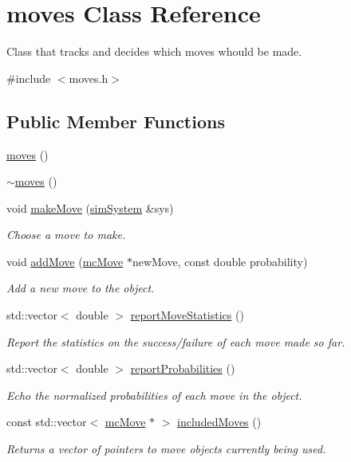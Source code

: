 \hypertarget{classmoves}{}\section{moves Class Reference}
\label{classmoves}


Class that tracks and decides which moves whould be made.  




{\ttfamily \#include $<$moves.\+h$>$}

\subsection*{Public Member Functions}
\begin{DoxyCompactItemize}
\item 
\hyperlink{classmoves_ac0af4672a995044ebba99f4a5865b28b}{moves} ()
\item 
\hyperlink{classmoves_a00dfff19abe056adceb0ccf41778ee0f}{$\sim$moves} ()
\item 
void \hyperlink{classmoves_a7f023913b80bb62604b99f4dbf005c37}{make\+Move} (\hyperlink{classsim_system}{sim\+System} \&sys)
\begin{DoxyCompactList}\small\item\em Choose a move to make. \end{DoxyCompactList}\item 
void \hyperlink{classmoves_a8ff3fea6241c0708ed08651c0b8c0c32}{add\+Move} (\hyperlink{classmc_move}{mc\+Move} $\ast$new\+Move, const double probability)
\begin{DoxyCompactList}\small\item\em Add a new move to the object. \end{DoxyCompactList}\item 
std\+::vector$<$ double $>$ \hyperlink{classmoves_a755de4c749706cd096327e1af9e676c3}{report\+Move\+Statistics} ()
\begin{DoxyCompactList}\small\item\em Report the statistics on the success/failure of each move made so far. \end{DoxyCompactList}\item 
std\+::vector$<$ double $>$ \hyperlink{classmoves_a84f8198bd43c0f6b8b52dce3abdfa6a4}{report\+Probabilities} ()
\begin{DoxyCompactList}\small\item\em Echo the normalized probabilities of each move in the object. \end{DoxyCompactList}\item 
const std\+::vector$<$ \hyperlink{classmc_move}{mc\+Move} $\ast$ $>$ \hyperlink{classmoves_a7371027cb97187cbf6e7dd6b5ca8345e}{included\+Moves} ()
\begin{DoxyCompactList}\small\item\em Returns a vector of pointers to move objects currently being used. \end{DoxyCompactList}\end{DoxyCompactItemize}


